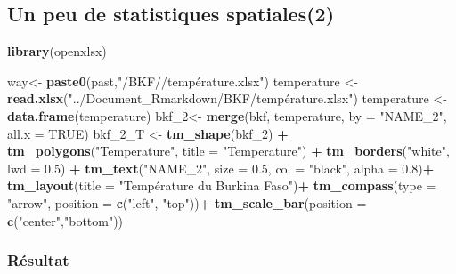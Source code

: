 \documentclass[
  12pt,
]{article}
\newenvironment{Shaded}{\begin{snugshade}}{\end{snugshade}}
\newcommand{\AttributeTok}[1]{\textcolor[rgb]{0.13,0.29,0.53}{#1}}
\newcommand{\ConstantTok}[1]{\textcolor[rgb]{0.56,0.35,0.01}{#1}}
\newcommand{\FloatTok}[1]{\textcolor[rgb]{0.00,0.00,0.81}{#1}}
\newcommand{\FunctionTok}[1]{\textcolor[rgb]{0.13,0.29,0.53}{\textbf{#1}}}
\newcommand{\NormalTok}[1]{#1}
\newcommand{\OtherTok}[1]{\textcolor[rgb]{0.56,0.35,0.01}{#1}}
\newcommand{\SpecialCharTok}[1]{\textcolor[rgb]{0.81,0.36,0.00}{\textbf{#1}}}
\newcommand{\StringTok}[1]{\textcolor[rgb]{0.31,0.60,0.02}{#1}}
\begin{document}
\subsection{Un peu de statistiques
spatiales(2)}\label{un-peu-de-statistiques-spatiales2}

\begin{Shaded}
\begin{Highlighting}[]
\FunctionTok{library}\NormalTok{(openxlsx)}

\NormalTok{way}\OtherTok{\textless{}{-}} \FunctionTok{paste0}\NormalTok{(past,}\StringTok{"/BKF//température.xlsx"}\NormalTok{)}
\NormalTok{temperature }\OtherTok{\textless{}{-}} \FunctionTok{read.xlsx}\NormalTok{(}\StringTok{"../Document\_Rmarkdown/BKF/température.xlsx"}\NormalTok{)}
\NormalTok{temperature }\OtherTok{\textless{}{-}} \FunctionTok{data.frame}\NormalTok{(temperature)}
\NormalTok{bkf\_2}\OtherTok{\textless{}{-}} \FunctionTok{merge}\NormalTok{(bkf, temperature, }\AttributeTok{by =} \StringTok{"NAME\_2"}\NormalTok{, }\AttributeTok{all.x =} \ConstantTok{TRUE}\NormalTok{)}
\NormalTok{bkf\_2\_T }\OtherTok{\textless{}{-}} \FunctionTok{tm\_shape}\NormalTok{(bkf\_2) }\SpecialCharTok{+} 
  \FunctionTok{tm\_polygons}\NormalTok{(}\StringTok{"Temperature"}\NormalTok{, }\AttributeTok{title =} \StringTok{"Temperature"}\NormalTok{) }\SpecialCharTok{+}
  \FunctionTok{tm\_borders}\NormalTok{(}\StringTok{"white"}\NormalTok{, }\AttributeTok{lwd =} \FloatTok{0.5}\NormalTok{) }\SpecialCharTok{+}
  \FunctionTok{tm\_text}\NormalTok{(}\StringTok{"NAME\_2"}\NormalTok{, }\AttributeTok{size =} \FloatTok{0.5}\NormalTok{, }\AttributeTok{col =} \StringTok{"black"}\NormalTok{, }\AttributeTok{alpha =} \FloatTok{0.8}\NormalTok{)}\SpecialCharTok{+}
  \FunctionTok{tm\_layout}\NormalTok{(}\AttributeTok{title =} \StringTok{"Température du Burkina Faso"}\NormalTok{)}\SpecialCharTok{+}
  \FunctionTok{tm\_compass}\NormalTok{(}\AttributeTok{type =} \StringTok{"arrow"}\NormalTok{, }\AttributeTok{position =} \FunctionTok{c}\NormalTok{(}\StringTok{"left"}\NormalTok{, }\StringTok{"top"}\NormalTok{))}\SpecialCharTok{+}
   \FunctionTok{tm\_scale\_bar}\NormalTok{(}\AttributeTok{position =} \FunctionTok{c}\NormalTok{(}\StringTok{"center"}\NormalTok{,}\StringTok{"bottom"}\NormalTok{))}
\end{Highlighting}
\end{Shaded}

\subsubsection{Résultat}\label{ruxe9sultat-3}
\end{document}
